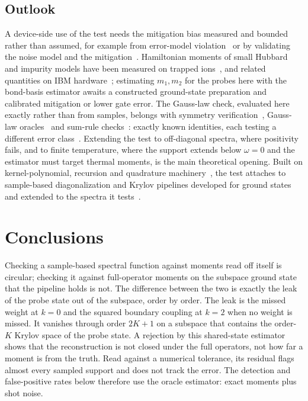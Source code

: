 \documentclass[submission, PhysCore]{SciPost}
\begin{document}
\subsection{Outlook}
\label{sec:outlook}
A device-side use of the test needs the mitigation bias measured and bounded rather than assumed, for example from error-model violation~\cite{Govia2025} or by validating the noise model and the mitigation~\cite{OEACV2026}. Hamiltonian moments of small Hubbard and impurity models have been measured on trapped ions~\cite{GreeneDiniz2024}, and related quantities on IBM hardware~\cite{Vallury2023,Leblanc2026}; estimating $m_1,m_2$ for the probes here with the bond-basis estimator awaits a constructed ground-state preparation and calibrated mitigation or lower gate error. The Gauss-law check, evaluated here exactly rather than from samples, belongs with symmetry verification~\cite{BonetMonroig2018,McArdleYuanBenjamin2019}, Gauss-law oracles~\cite{Stryker2019} and sum-rule checks~\cite{TurkowskiFreericks2006,Freericks2009}: exactly known identities, each testing a different error class~\cite{Gauss2020}. Extending the test to off-diagonal spectra, where positivity fails, and to finite temperature, where the support extends below $\omega=0$ and the estimator must target thermal moments, is the main theoretical opening. Built on kernel-polynomial, recursion and quadrature machinery~\cite{KPM2006,Haydock1972,GM2010}, the test attaches to sample-based diagonalization and Krylov pipelines developed for ground states~\cite{SQDchem2025,QSCI2023,SKQD2501,SqDRIFT2508,QKDHub2607} and extended to the spectra it tests~\cite{SQDspec2608,Patel2026}.

\section{Conclusions}
\label{sec:conclusions}
Checking a sample-based spectral function against moments read off itself is circular; checking it against full-operator moments on the subspace ground state that the pipeline holds is not. The difference between the two is exactly the leak of the probe state out of the subspace, order by order. The leak is the missed weight at $k=0$ and the squared boundary coupling at $k=2$ when no weight is missed. It vanishes through order $2K+1$ on a subspace that contains the order-$K$ Krylov space of the probe state. A rejection by this shared-state estimator shows that the reconstruction is not closed under the full operators, not how far a moment is from the truth. Read against a numerical tolerance, its residual flags almost every sampled support and does not track the error. The detection and false-positive rates below therefore use the oracle estimator: exact moments plus shot noise.
\end{document}

